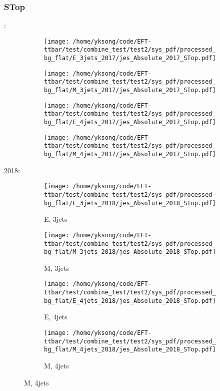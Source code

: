 \documentclass{beamer}
\begin{document}
\begin{frame}
\frametitle{STop}
\fontsize{5}{1}:
\begin{figure}
\centering
\begin{subfigure}[b]{0.24\textwidth}
\texttt{[image: /home/yksong/code/EFT-ttbar/test/combine\_test/test2/sys\_pdf/processed\_bg\_flat/E\_3jets\_2017/jes\_Absolute\_2017\_STop.pdf]}
\end{subfigure}
\begin{subfigure}[b]{0.24\textwidth}
\texttt{[image: /home/yksong/code/EFT-ttbar/test/combine\_test/test2/sys\_pdf/processed\_bg\_flat/M\_3jets\_2017/jes\_Absolute\_2017\_STop.pdf]}
\end{subfigure}
\begin{subfigure}[b]{0.24\textwidth}
\texttt{[image: /home/yksong/code/EFT-ttbar/test/combine\_test/test2/sys\_pdf/processed\_bg\_flat/E\_4jets\_2017/jes\_Absolute\_2017\_STop.pdf]}
\end{subfigure}
\begin{subfigure}[b]{0.24\textwidth}
\texttt{[image: /home/yksong/code/EFT-ttbar/test/combine\_test/test2/sys\_pdf/processed\_bg\_flat/M\_4jets\_2017/jes\_Absolute\_2017\_STop.pdf]}
\end{subfigure}
\end{figure}
2018:
\begin{figure}
\centering
\begin{subfigure}[b]{0.24\textwidth}
\texttt{[image: /home/yksong/code/EFT-ttbar/test/combine\_test/test2/sys\_pdf/processed\_bg\_flat/E\_3jets\_2018/jes\_Absolute\_2018\_STop.pdf]}
\captionsetup{font=tiny}
\caption{E, 3jets}
\end{subfigure}
\begin{subfigure}[b]{0.24\textwidth}
\texttt{[image: /home/yksong/code/EFT-ttbar/test/combine\_test/test2/sys\_pdf/processed\_bg\_flat/M\_3jets\_2018/jes\_Absolute\_2018\_STop.pdf]}
\captionsetup{font=tiny}
\caption{M, 3jets}
\end{subfigure}
\begin{subfigure}[b]{0.24\textwidth}
\texttt{[image: /home/yksong/code/EFT-ttbar/test/combine\_test/test2/sys\_pdf/processed\_bg\_flat/E\_4jets\_2018/jes\_Absolute\_2018\_STop.pdf]}
\captionsetup{font=tiny}
\caption{E, 4jets}
\end{subfigure}
\begin{subfigure}[b]{0.24\textwidth}
\texttt{[image: /home/yksong/code/EFT-ttbar/test/combine\_test/test2/sys\_pdf/processed\_bg\_flat/M\_4jets\_2018/jes\_Absolute\_2018\_STop.pdf]}
\captionsetup{font=tiny}
\caption{M, 4jets}
\end{subfigure}
\end{figure}
\end{frame}
\end{document}
